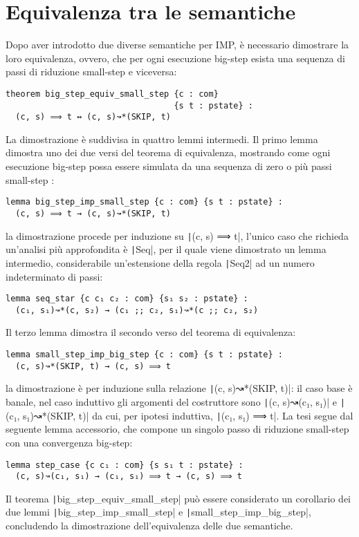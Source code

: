 \section{Equivalenza tra le semantiche}
Dopo aver introdotto due diverse semantiche per IMP, è necessario dimostrare la loro equivalenza, ovvero, che per ogni esecuzione big-step esista una sequenza di passi di riduzione small-step e viceversa:
\begin{verbatim}
theorem big_step_equiv_small_step {c : com} 
                                  {s t : pstate} :
  (c, s) ⟹ t ↔ (c, s)↝*(SKIP, t)
\end{verbatim}
La dimostrazione è suddivisa in quattro lemmi intermedi.
Il primo lemma dimostra uno dei due versi del teorema di equivalenza, mostrando come ogni esecuzione big-step possa essere simulata da una sequenza di zero o più passi small-step :
\begin{verbatim}
lemma big_step_imp_small_step {c : com} {s t : pstate} : 
  (c, s) ⟹ t → (c, s)↝*(SKIP, t)
\end{verbatim}
la dimostrazione procede per induzione su \texttt|(c, s) ⟹ t|, l'unico caso che richieda un'analisi più approfondita è \texttt|Seq|, per il quale viene dimostrato un lemma intermedio, considerabile un'estensione della regola \texttt|Seq2| ad un numero indeterminato di passi:
\begin{verbatim}
lemma seq_star {c c₁ c₂ : com} {s₁ s₂ : pstate} :
  (c₁, s₁)↝*(c, s₂) → (c₁ ;; c₂, s₁)↝*(c ;; c₂, s₂) 
\end{verbatim}

Il terzo lemma dimostra il secondo verso del teorema di equivalenza:
\begin{verbatim}
lemma small_step_imp_big_step {c : com} {s t : pstate} :
  (c, s)↝*(SKIP, t) → (c, s) ⟹ t
\end{verbatim}
la dimostrazione è per induzione sulla relazione \texttt|(c, s)↝*(SKIP, t)|:  il caso base è banale, nel caso induttivo gli argomenti del costruttore sono \texttt|(c, s)↝(c₁, s₁)| e \texttt|(c₁, s₁)↝*(SKIP, t)| da cui, per ipotesi induttiva, \texttt|(c₁, s₁) ⟹ t|. La tesi segue dal seguente lemma accessorio, che compone un singolo passo di riduzione small-step con una convergenza big-step:
\begin{verbatim}
lemma step_case {c c₁ : com} {s s₁ t : pstate} : 
  (c, s)↝(c₁, s₁) → (c₁, s₁) ⟹ t → (c, s) ⟹ t
\end{verbatim}

Il teorema \texttt|big_step_equiv_small_step| può essere considerato un corollario dei due lemmi \texttt|big_step_imp_small_step| e \texttt|small_step_imp_big_step|, concludendo la dimostrazione dell'equivalenza delle due semantiche.

